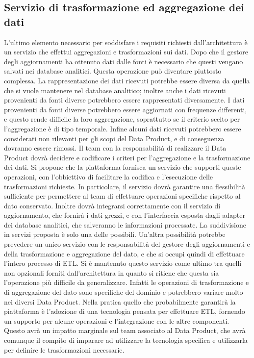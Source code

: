 \documentclass[12pt]{report}
\begin{document}
\subsection{Servizio di trasformazione ed aggregazione dei dati}
L'ultimo elemento necessario per soddisfare i requisiti richiesti dall'architettura è un servizio che effettui aggregazioni e trasformazioni sui dati.
Dopo che il gestore degli aggiornamenti ha ottenuto dati dalle fonti è necessario che questi vengano salvati nei database analitici.
Questa operazione può diventare piuttosto complessa.
La rappresentazione dei dati ricevuti potrebbe essere diversa da quella che si vuole mantenere nel database analitico; inoltre anche i dati ricevuti provenienti da fonti diverse potrebbero essere rappresentati diversamente.
I dati provenienti da fonti diverse potrebbero essere aggiornati con frequenze differenti, e questo rende difficile la loro aggregazione, soprattutto se il criterio scelto per l'aggregazione è di tipo temporale.
Infine alcuni dati ricevuti potrebbero essere considerati non rilevanti per gli scopi del Data Product, e di conseguenza dovranno essere rimossi.
Il team con la responsabilità di realizzare il Data Product dovrà decidere e codificare i criteri per l'aggregazione e la trasformazione dei dati.
Si propone che la piattaforma fornisca un servizio che supporti queste operazioni, con l'obbiettivo di facilitare la codifica e l'esecuzione delle trasformazioni richieste.
In particolare, il servizio dovrà garantire una flessibilità sufficiente per permettere al team di effettuare operazioni specifiche rispetto al dato conservato.
Inoltre dovrà integrarsi correttamente con il servizio di aggiornamento, che fornirà i dati grezzi, e con l'interfaccia esposta dagli adapter dei database analitici, che salveranno le informazioni processate.
La suddivisione in servizi proposta è solo una delle possibili. 
Un'altra possibilità potrebbe prevedere un unico servizio con le responsabilità del gestore degli aggiornamenti e della  trasformazione e aggregazione del dato, e che si occupi quindi di effettuare l'intero processo di ETL.
Si è mantenuto questo servizio come ultimo tra quelli non opzionali forniti dall'architettura in quanto si ritiene che questa sia l'operazione più difficile da generalizzare.
Infatti le operazioni di trasformazione e di aggregazione del dato sono specifiche del dominio e potrebbero variare molto nei diversi Data Product.
Nella pratica quello che probabilmente garantirà la piattaforma è l'adozione di una tecnologia pensata per effettuare ETL, fornendo un supporto per alcune operazioni e l'integrazione con le altre componenti.
Questo avrà un impatto marginale sul team associato al Data Product, che avrà comunque il compito di imparare ad utilizzare la tecnologia specifica e utilizzarla per definire le trasformazioni necessarie.
\end{document}
